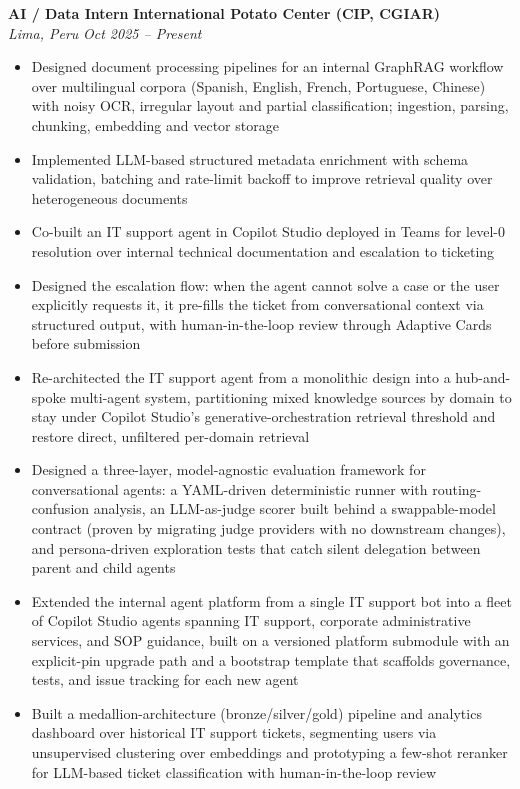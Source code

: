 \documentclass[a4paper,10pt]{article}
\begin{document}
\textbf{AI / Data Intern} \hfill \textbf{International Potato Center (CIP, CGIAR)}\\
\textit{Lima, Peru} \hfill \textit{Oct 2025 -- Present}
\begin{itemize}[leftmargin=1.2em, itemsep=1pt, topsep=2pt]
  \item Designed document processing pipelines for an internal GraphRAG workflow over multilingual corpora (Spanish, English, French, Portuguese, Chinese) with noisy OCR, irregular layout and partial classification; ingestion, parsing, chunking, embedding and vector storage
  \item Implemented LLM-based structured metadata enrichment with schema validation, batching and rate-limit backoff to improve retrieval quality over heterogeneous documents
  \item Co-built an IT support agent in Copilot Studio deployed in Teams for level-0 resolution over internal technical documentation and escalation to ticketing
  \item Designed the escalation flow: when the agent cannot solve a case or the user explicitly requests it, it pre-fills the ticket from conversational context via structured output, with human-in-the-loop review through Adaptive Cards before submission
  \item Re-architected the IT support agent from a monolithic design into a hub-and-spoke multi-agent system, partitioning mixed knowledge sources by domain to stay under Copilot Studio's generative-orchestration retrieval threshold and restore direct, unfiltered per-domain retrieval
  \item Designed a three-layer, model-agnostic evaluation framework for conversational agents: a YAML-driven deterministic runner with routing-confusion analysis, an LLM-as-judge scorer built behind a swappable-model contract (proven by migrating judge providers with no downstream changes), and persona-driven exploration tests that catch silent delegation between parent and child agents
  \item Extended the internal agent platform from a single IT support bot into a fleet of Copilot Studio agents spanning IT support, corporate administrative services, and SOP guidance, built on a versioned platform submodule with an explicit-pin upgrade path and a bootstrap template that scaffolds governance, tests, and issue tracking for each new agent
  \item Built a medallion-architecture (bronze/silver/gold) pipeline and analytics dashboard over historical IT support tickets, segmenting users via unsupervised clustering over embeddings and prototyping a few-shot reranker for LLM-based ticket classification with human-in-the-loop review
\end{itemize}
\end{document}
